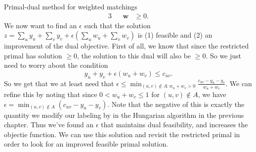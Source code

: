 \begin{section}{Primal-dual method for weighted matchings}
\begin{alignat}{3}
				     && \mathbf{w} & \geq 0.
	\end{alignat}
	We now want to find an $\epsilon$ such that the solution $z = \sum_u y_u + \sum_v y_v + 
	\epsilon (\sum_u w_u + \sum_v w_v)$ is (1) feasible and (2) an improvement of the dual 
	objective. First of all, we know that since the restricted primal has solution $\geq 0$, 
	the solution to this dual will also be $\geq 0$. So we just need to worry about the condition 
	\[
		y_u + y_v + \epsilon (w_u + w_v) \leq c_{uv}.
	\]
	So we get that we at least need that $\epsilon \leq \min_{(u,v)\notin A: w_u + w_v > 0}
	\frac{c_{uv} - y_u - y_v}{w_u + w_v}$. We can refine this by noting that since 
	$0 < w_u + w_v \leq 1$ for $(u,v)\notin A$, we have $\epsilon = \min_{(u,v)\notin A} 
	(c_{uv} - y_u - y_v)$. Note that the negative of this is exactly the quantity we modify our 
	labeling by in the Hungarian algorithm in the previous chapter. Thus we've found an 
	$\epsilon$ that maintains dual feasibility, and increases the objectie function. We can use 
	this solution and revisit the restricted primal in order to look for an improved feasible 
	primal solution.
\end{section}

